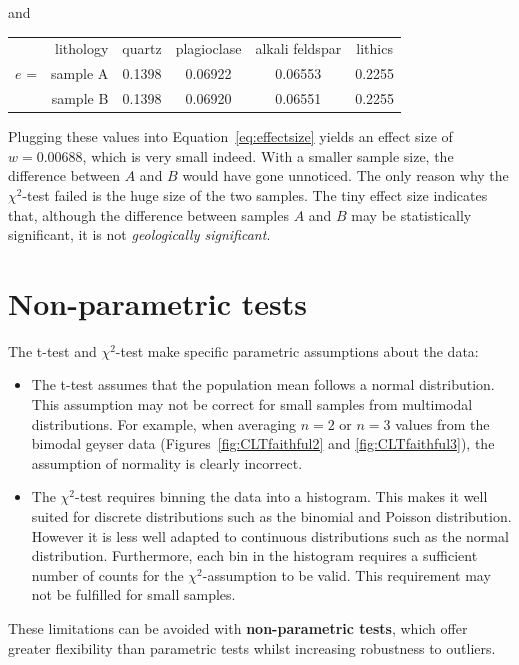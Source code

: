 \noindent and

\begin{center}
  \begin{tabular}{rr|cccc}
    & lithology & quartz & plagioclase & alkali feldspar & lithics  \\
    \cline{2-6}
    $e$ = & sample A & 0.1398 & 0.06922 & 0.06553 & 0.2255 \\
    & sample B & 0.1398 & 0.06920 & 0.06551 & 0.2255
  \end{tabular}
\end{center}

Plugging these values into Equation~\ref{eq:effectsize} yields an
effect size of $w=0.00688$, which is very small indeed. With a smaller
sample size, the difference between $A$ and $B$ would have gone
unnoticed.  The only reason why the $\chi^2$-test failed is the huge
size of the two samples. The tiny effect size indicates that, although
the difference between samples $A$ and $B$ may be statistically
significant, it is not \textit{geologically significant}.

\section{Non-parametric tests}
\label{sec:nonparametric}

The t-test and $\chi^2$-test make specific parametric assumptions
about the data:

\begin{itemize}
  \item The t-test assumes that the population mean follows a normal
    distribution. This assumption may not be correct for small samples
    from multimodal distributions. For example, when averaging $n=2$
    or $n=3$ values from the bimodal geyser data
    (Figures~\ref{fig:CLTfaithful2} and \ref{fig:CLTfaithful3}), the
    assumption of normality is clearly incorrect.
  \item The $\chi^2$-test requires binning the data into a
    histogram. This makes it well suited for discrete distributions
    such as the binomial and Poisson distribution. However it is less
    well adapted to continuous distributions such as the normal
    distribution. Furthermore, each bin in the histogram requires a
    sufficient number of counts for the $\chi^2$-assumption to be
    valid. This requirement may not be fulfilled for small samples.
\end{itemize}

These limitations can be avoided with \textbf{non-parametric tests},
which offer greater flexibility than parametric tests whilst
increasing robustness to outliers.\medskip

